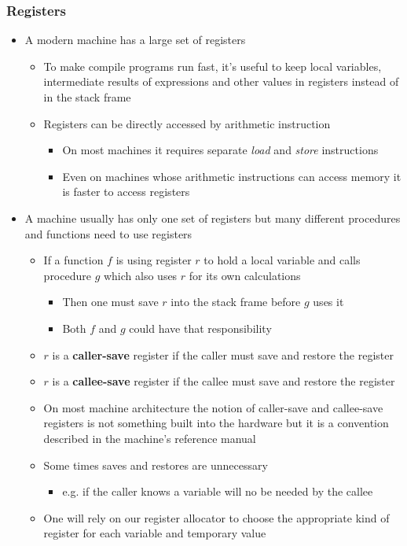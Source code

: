 \documentclass[11pt]{article}
\begin{document}
\subsubsection{Registers}
\label{sec:org9080cb4}
\begin{itemize}
\item A modern machine has a large set of registers
\begin{itemize}
\item To make compile programs run fast, it's useful to keep local variables, intermediate results of expressions and other values in registers instead of in the stack frame
\item Registers can be directly accessed by arithmetic instruction
\begin{itemize}
\item On most machines it requires separate \emph{load} and \emph{store} instructions
\item Even on machines whose arithmetic instructions can access memory it is faster to access registers
\end{itemize}
\end{itemize}

\item A machine usually has only one set of registers but many different procedures and functions need to use registers
\begin{itemize}
\item If a function \(f\) is using register \(r\) to hold a local variable and calls procedure \(g\) which also uses \(r\) for its own calculations
\begin{itemize}
\item Then one must save \(r\) into the stack frame before \(g\) uses it
\item Both \(f\) and \(g\) could have that responsibility
\end{itemize}
\item \(r\) is a \textbf{caller-save} register if the caller must save and restore the register
\item \(r\) is a \textbf{callee-save} register if the callee must save and restore the register
\item On most machine architecture the notion of caller-save and callee-save registers is not something built into the hardware but it is a convention described in the machine's reference manual
\item Some times saves and restores are unnecessary
\begin{itemize}
\item e.g. if the caller knows a variable will no be needed by the callee
\end{itemize}
\item One will rely on our register allocator to choose the appropriate kind of register for each variable and temporary value
\end{itemize}
\end{itemize}
\end{document}
